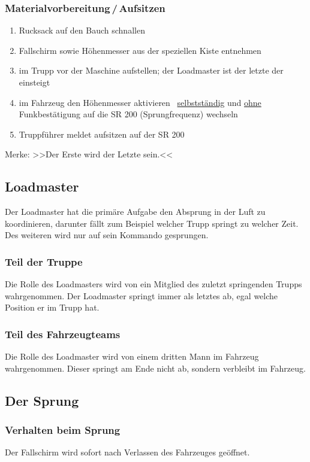 \subsubsection*{Materialvorbereitung\,/\,Aufsitzen}
\begin{enumerate}
	\item Rucksack auf den Bauch schnallen 
	\item Fallschirm sowie Höhenmesser aus der speziellen Kiste entnehmen
	\item im Trupp vor der Maschine aufstellen; der Loadmaster ist der letzte der einsteigt
	\item im Fahrzeug den Höhenmesser aktivieren \ \underline{selbstständig} und \underline{ohne} Funkbestätigung auf die SR 200 (Sprungfrequenz) wechseln
	\item Truppführer meldet aufsitzen auf der SR 200
\end{enumerate}

\begin{flushright}
	Merke: >>Der Erste wird der Letzte sein.<< 
\end{flushright} 


\subsection{Loadmaster}
Der Loadmaster hat die primäre Aufgabe den Absprung in der Luft zu koordinieren, darunter fällt
zum Beispiel welcher Trupp springt zu welcher Zeit. Des weiteren wird nur auf sein Kommando
gesprungen.

\subsubsection*{Teil der Truppe}
	Die Rolle des Loadmasters wird von ein Mitglied des zuletzt springenden Trupps wahrgenommen.
	Der Loadmaster springt immer als letztes ab, egal welche Position er im Trupp hat.

\subsubsection*{Teil des Fahrzeugteams}
	Die Rolle des Loadmaster wird von einem dritten Mann im Fahrzeug wahrgenommen. Dieser springt am Ende nicht ab, sondern verbleibt im Fahrzeug.

\subsection{Der Sprung}
\subsubsection*{Verhalten beim Sprung}
	Der Fallschirm wird sofort nach Verlassen des Fahrzeuges geöffnet.
	
